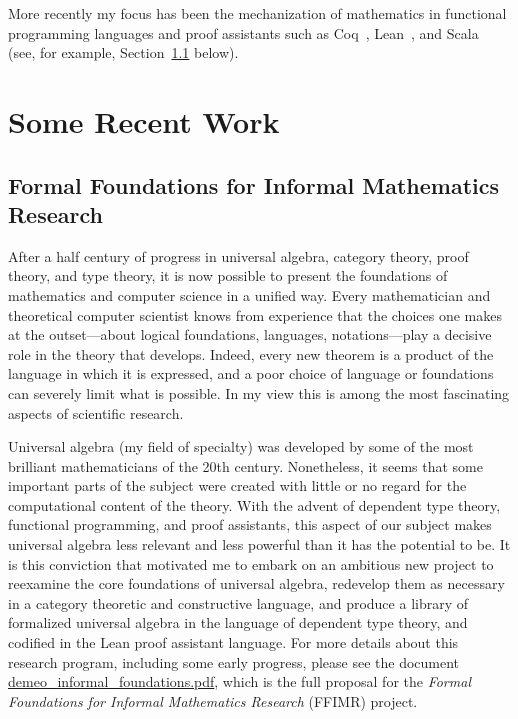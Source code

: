 \documentclass[11pt]{amsart}
\begin{document}
More recently my focus has been the mechanization of mathematics in functional programming languages and proof assistants such as Coq~\cite{the_coq_development_team_2019_2554024}, Lean~\cite{lean}, and Scala~\cite{odersky2004overview} (see, for example, Section~\ref{sec:formal} below).

\section{Some Recent Work}

\subsection{Formal Foundations for Informal Mathematics Research}
\label{sec:formal}
After a half century of progress in universal algebra, category theory, proof theory, and type theory, it is now possible to present the foundations of mathematics and computer science in a unified way.  Every mathematician and theoretical computer scientist knows from experience that the choices one makes at the outset---about logical foundations, languages, notations---play a decisive role in the theory that develops.  Indeed, every new theorem is a product of the language in which it is expressed, and a poor choice of language or foundations can severely limit what is possible. In my view this is among the most fascinating aspects of scientific research.

Universal algebra (my field of specialty) was developed by some of the most brilliant mathematicians of the 20th century. Nonetheless, it seems that some important parts of the subject were created with little or no regard for the computational content of the theory.  With the advent of dependent type theory, functional programming, and proof assistants, this aspect of our subject makes universal algebra less relevant and less powerful than it has the potential to be. It is this conviction that motivated me to embark on an ambitious new project to reexamine the core foundations of universal algebra, redevelop them as necessary in a category theoretic and constructive language, and produce a library of formalized universal algebra in the language of dependent type theory, and codified in the Lean proof assistant language.  For more details about this research program, including some early progress, please see the document \href{https://github.com/williamdemeo/job-app/blob/master/research/demeo_informal_foundations.pdf}{demeo\_informal\_foundations.pdf}, which is the full proposal for the \emph{Formal Foundations for Informal Mathematics Research} (FFIMR) project.
\end{document}
